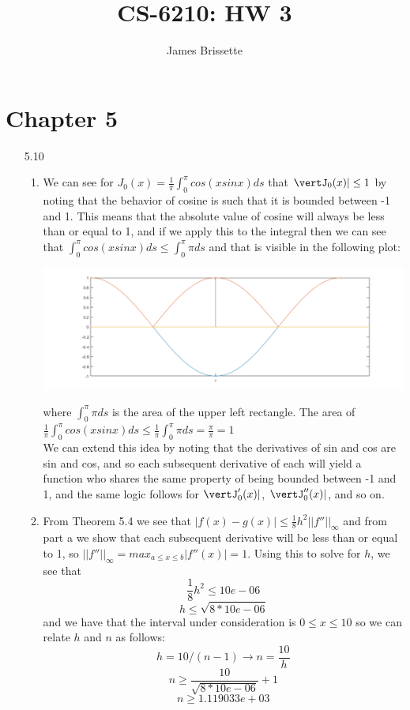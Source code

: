 \documentclass[11pt,a4paper]{article}
\author{James Brissette}
\title{CS-6210: HW 3}
\begin{document}
	\maketitle
	
	\section{Chapter 5}
		\begin{itemize}
			\item[5.10]
				\begin{enumerate} [label={\alph*)}]
					\item We can see for $J_0(x) = \frac{1}{\pi}\int_{0}^{\pi}cos(xsinx)ds$ that $\vertJ_0(x)\vert \leq 1$ by noting that the behavior of cosine is such that it is bounded between -1 and 1. This means that the absolute value of cosine will always be less than or equal to 1, and if we apply this to the integral then we can see that $\int_{0}^{\pi}cos(xsinx)ds \leq \int_{0}^{\pi}\pi ds$ and that is visible in the following plot:
					\begin{center}
						\includegraphics[width=1\linewidth]{ch5q10}
					\end{center}
				where $\int_{0}^{\pi}\pi ds$ is the area of the upper left rectangle. The area of $\frac{1}{\pi}\int_{0}^{\pi}cos(xsinx)ds \leq \frac{1}{\pi}\int_{0}^{\pi}\pi ds = \frac{\pi}{\pi} = 1$ \\
				
				We can extend this idea by noting that the derivatives of sin and cos are sin and cos, and so each subsequent derivative of each will yield a function who shares the same property of being bounded between -1 and 1, and the same logic follows for $\vertJ'_0(x)\vert$, $\vertJ''_0(x)\vert$, and so on.
					\item From Theorem 5.4 we see that $\vert f(x) - g(x) \vert \leq \frac{1}{8}h^2\vert \vert f'' \vert \vert_\infty$ and from part a we show that each subsequent derivative will be less than or equal to 1, so $\vert \vert f'' \vert \vert_\infty = max_{a \leq x \leq b} \vert f''(x) \vert = 1$. Using this to solve for $h$, we see that 
					$$\frac{1}{8}h^2 \leq 10e-06$$
					$$h \leq \sqrt{8*10e-06}$$
					and we have that the interval under consideration is $0 \leq x \leq 10$ so we can relate $h$ and $n$ as follows:
					$$h = 10/(n-1) \rightarrow n = \frac{10}{h}$$
					$$n \geq \frac{10}{\sqrt{8*10e-06}} + 1$$
					$$n \geq 1.119033e+03$$
					

\end{enumerate}
\end{itemize}
\end{document}
